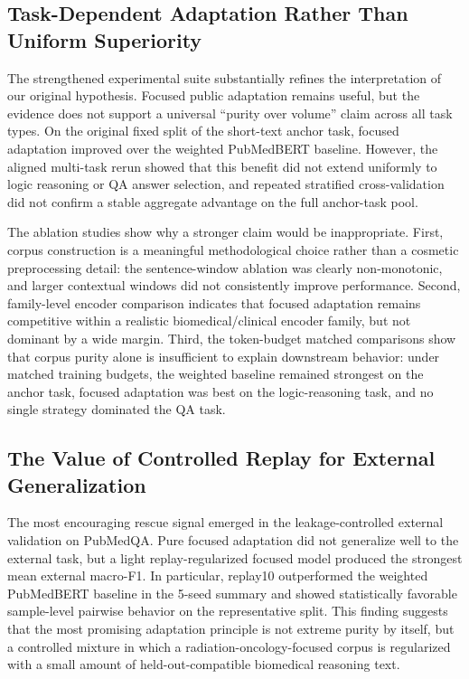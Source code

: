 \documentclass[a4paper,fleqn]{cas-dc}
\begin{document}
\fi

\subsection{Task-Dependent Adaptation Rather Than Uniform Superiority}
The strengthened experimental suite substantially refines the interpretation of our original hypothesis. Focused public adaptation remains useful, but the evidence does not support a universal ``purity over volume'' claim across all task types. On the original fixed split of the short-text anchor task, focused adaptation improved over the weighted PubMedBERT baseline. However, the aligned multi-task rerun showed that this benefit did not extend uniformly to logic reasoning or QA answer selection, and repeated stratified cross-validation did not confirm a stable aggregate advantage on the full anchor-task pool.

The ablation studies show why a stronger claim would be inappropriate. First, corpus construction is a meaningful methodological choice rather than a cosmetic preprocessing detail: the sentence-window ablation was clearly non-monotonic, and larger contextual windows did not consistently improve performance. Second, family-level encoder comparison indicates that focused adaptation remains competitive within a realistic biomedical/clinical encoder family, but not dominant by a wide margin. Third, the token-budget matched comparisons show that corpus purity alone is insufficient to explain downstream behavior: under matched training budgets, the weighted baseline remained strongest on the anchor task, focused adaptation was best on the logic-reasoning task, and no single strategy dominated the QA task.

\subsection{The Value of Controlled Replay for External Generalization}
The most encouraging rescue signal emerged in the leakage-controlled external validation on PubMedQA. Pure focused adaptation did not generalize well to the external task, but a light replay-regularized focused model produced the strongest mean external macro-F1. In particular, replay10 outperformed the weighted PubMedBERT baseline in the 5-seed summary and showed statistically favorable sample-level pairwise behavior on the representative split. This finding suggests that the most promising adaptation principle is not extreme purity by itself, but a controlled mixture in which a radiation-oncology-focused corpus is regularized with a small amount of held-out-compatible biomedical reasoning text.
\end{document}
